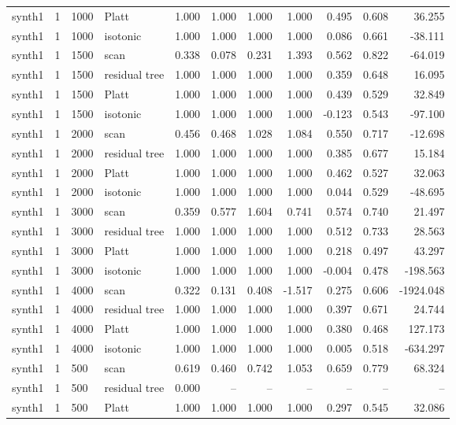 \begin{tabular}{lrllrrrrrrr}
synth1 & 1 & 1000 & Platt & 1.000 & 1.000 & 1.000 & 1.000 & 0.495 & 0.608 & 36.255 \\
synth1 & 1 & 1000 & isotonic & 1.000 & 1.000 & 1.000 & 1.000 & 0.086 & 0.661 & -38.111 \\
synth1 & 1 & 1500 & scan & 0.338 & 0.078 & 0.231 & 1.393 & 0.562 & 0.822 & -64.019 \\
synth1 & 1 & 1500 & residual tree & 1.000 & 1.000 & 1.000 & 1.000 & 0.359 & 0.648 & 16.095 \\
synth1 & 1 & 1500 & Platt & 1.000 & 1.000 & 1.000 & 1.000 & 0.439 & 0.529 & 32.849 \\
synth1 & 1 & 1500 & isotonic & 1.000 & 1.000 & 1.000 & 1.000 & -0.123 & 0.543 & -97.100 \\
synth1 & 1 & 2000 & scan & 0.456 & 0.468 & 1.028 & 1.084 & 0.550 & 0.717 & -12.698 \\
synth1 & 1 & 2000 & residual tree & 1.000 & 1.000 & 1.000 & 1.000 & 0.385 & 0.677 & 15.184 \\
synth1 & 1 & 2000 & Platt & 1.000 & 1.000 & 1.000 & 1.000 & 0.462 & 0.527 & 32.063 \\
synth1 & 1 & 2000 & isotonic & 1.000 & 1.000 & 1.000 & 1.000 & 0.044 & 0.529 & -48.695 \\
synth1 & 1 & 3000 & scan & 0.359 & 0.577 & 1.604 & 0.741 & 0.574 & 0.740 & 21.497 \\
synth1 & 1 & 3000 & residual tree & 1.000 & 1.000 & 1.000 & 1.000 & 0.512 & 0.733 & 28.563 \\
synth1 & 1 & 3000 & Platt & 1.000 & 1.000 & 1.000 & 1.000 & 0.218 & 0.497 & 43.297 \\
synth1 & 1 & 3000 & isotonic & 1.000 & 1.000 & 1.000 & 1.000 & -0.004 & 0.478 & -198.563 \\
synth1 & 1 & 4000 & scan & 0.322 & 0.131 & 0.408 & -1.517 & 0.275 & 0.606 & -1924.048 \\
synth1 & 1 & 4000 & residual tree & 1.000 & 1.000 & 1.000 & 1.000 & 0.397 & 0.671 & 24.744 \\
synth1 & 1 & 4000 & Platt & 1.000 & 1.000 & 1.000 & 1.000 & 0.380 & 0.468 & 127.173 \\
synth1 & 1 & 4000 & isotonic & 1.000 & 1.000 & 1.000 & 1.000 & 0.005 & 0.518 & -634.297 \\
synth1 & 1 & 500 & scan & 0.619 & 0.460 & 0.742 & 1.053 & 0.659 & 0.779 & 68.324 \\
synth1 & 1 & 500 & residual tree & 0.000 & -- & -- & -- & -- & -- & -- \\
synth1 & 1 & 500 & Platt & 1.000 & 1.000 & 1.000 & 1.000 & 0.297 & 0.545 & 32.086 \\

\end{tabular}
